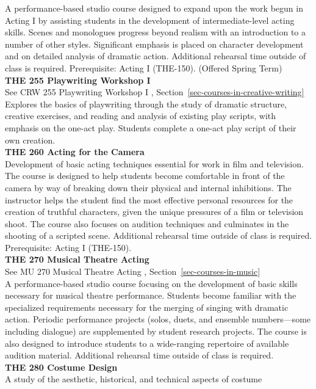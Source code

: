 \documentclass[
  letterpaper,
]{scrbook}
\begin{document}
A performance-based studio course designed to expand upon the work begun
in Acting I by assisting students in the development of
intermediate-level acting skills. Scenes and monologues progress beyond
realism with an introduction to a number of other styles. Significant
emphasis is placed on character development and on detailed analysis of
dramatic action. Additional rehearsal time outside of class is required.
Prerequisite: Acting I (THE-150). (Offered Spring Term)\\
\textbf{THE 255 Playwriting Workshop I}\\
See CRW 255 Playwriting Workshop I ,
Section~\ref{sec-courses-in-creative-writing}\\
Explores the basics of playwriting through the study of dramatic
structure, creative exercises, and reading and analysis of existing play
scripts, with emphasis on the one-act play. Students complete a one-act
play script of their own creation.\\
\textbf{THE 260 Acting for the Camera}\\
Development of basic acting techniques essential for work in film and
television. The course is designed to help students become comfortable
in front of the camera by way of breaking down their physical and
internal inhibitions. The instructor helps the student find the most
effective personal resources for the creation of truthful characters,
given the unique pressures of a film or television shoot. The course
also focuses on audition techniques and culminates in the shooting of a
scripted scene. Additional rehearsal time outside of class is required.
Prerequisite: Acting I (THE-150).\\
\textbf{THE 270 Musical Theatre Acting}\\
See MU 270 Musical Theatre Acting , Section~\ref{sec-courses-in-music}\\
A performance-based studio course focusing on the development of basic
skills necessary for musical theatre performance. Students become
familiar with the specialized requirements necessary for the merging of
singing with dramatic action. Periodic performance projects (solos,
duets, and ensemble numbers---some including dialogue) are supplemented
by student research projects. The course is also designed to introduce
students to a wide-ranging repertoire of available audition material.
Additional rehearsal time outside of class is required.\\
\textbf{THE 280 Costume Design}\\
A study of the aesthetic, historical, and technical aspects of costume
\end{document}

